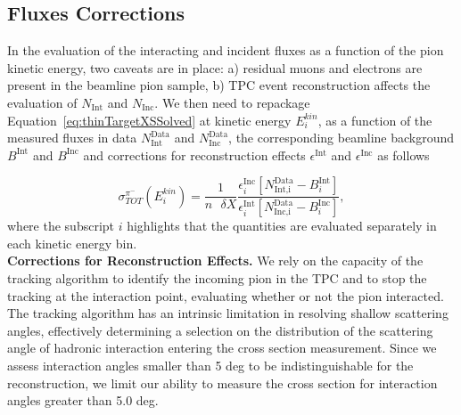 \documentclass[aps,prl,twocolumn,showpacs,superscriptaddress,groupedaddress]{revtex4}  %
\begin{document}

 


\subsection{\label{sec:Corrections}Fluxes Corrections}
In the evaluation of the interacting and incident fluxes as a function of the pion kinetic energy,  two caveats are in place: a) residual muons and electrons are present in the beamline pion sample, b) TPC event reconstruction affects the evaluation of  $N_{\text{Int}}$ and $N_{\text{Inc}}$.
We then need to repackage Equation~\ref{eq:thinTargetXSSolved} at kinetic energy $E^{kin}_i$, as a function of the measured fluxes in data $N^{\text{Data}}_{\text{Int}}$ and $N^{\text{Data}}_{\text{Inc}}$, the corresponding beamline background $B^{ \text{Int}}$ and $B^{ \text{Inc}}$ and corrections for reconstruction effects $\epsilon^{\text{Int}}$ and $\epsilon^{\text{Inc}}$ as follows

\begin{equation}
 \sigma^{\pi^-}_{TOT}(E^{kin}_i) = \frac{1}{n \text{ }\delta X}\frac{ \epsilon^{\text{Inc}}_i [ N^{ \text{Data}}_{ \text{Int,i}} - B^{ \text{Int}}_i] }{   \epsilon^{\text{Int}}_i [N^{ \text{Data}}_{ \text{Inc,i}} - B^{ \text{Inc}} _i]},
\label{eq:True}
\end{equation}
where the subscript $i$ highlights that the quantities are evaluated separately in each kinetic energy bin.\\



\textbf{Corrections for Reconstruction Effects.}
We rely on the capacity of the tracking algorithm to identify the incoming pion in the TPC and to stop the tracking at the interaction point, evaluating whether or not the pion interacted.  The tracking algorithm has an intrinsic limitation in resolving shallow scattering angles, effectively determining a selection on the distribution of the scattering angle of hadronic interaction entering the cross section measurement.  Since we assess interaction angles smaller than 5 deg to be indistinguishable for the reconstruction, we limit our ability to measure the cross section for interaction angles greater than 5.0 deg. 
\end{document}
